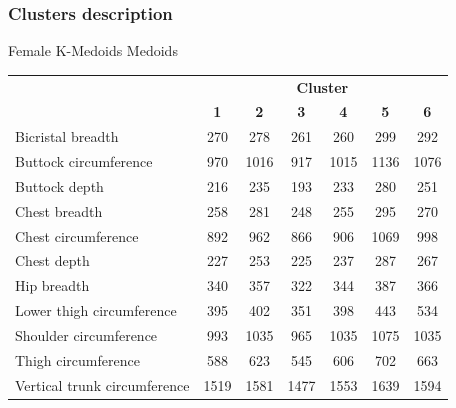 \documentclass[10pt]{beamer}
\begin{document}
\subsubsection{Clusters description}
\begin{frame}{Female K-Medoids Medoids}
	\scriptsize
	\centering
	\begin{tabular}{lcccccc}
		\cline{2-7}
		                             & \multicolumn{6}{c}{\textbf{Cluster}}                                                                  \\
		                             & \textbf{1}                           & \textbf{2} & \textbf{3} & \textbf{4} & \textbf{5} & \textbf{6} \\
		\hline\hline
		Bicristal breadth            & 270                                  & 278        & 261        & 260        & 299        & 292        \\
		Buttock circumference        & 970                                  & 1016       & 917        & 1015       & 1136       & 1076       \\
		Buttock depth                & 216                                  & 235        & 193        & 233        & 280        & 251        \\
		Chest breadth                & 258                                  & 281        & 248        & 255        & 295        & 270        \\
		Chest circumference          & 892                                  & 962        & 866        & 906        & 1069       & 998        \\
		Chest depth                  & 227                                  & 253        & 225        & 237        & 287        & 267        \\
		Hip breadth                  & 340                                  & 357        & 322        & 344        & 387        & 366        \\
		Lower thigh circumference    & 395                                  & 402        & 351        & 398        & 443        & 534        \\
		Shoulder circumference       & 993                                  & 1035       & 965        & 1035       & 1075       & 1035       \\
		Thigh circumference          & 588                                  & 623        & 545        & 606        & 702        & 663        \\
		Vertical trunk circumference & 1519                                 & 1581       & 1477       & 1553       & 1639       & 1594       \\

\end{tabular}
\end{frame}
\end{document}
